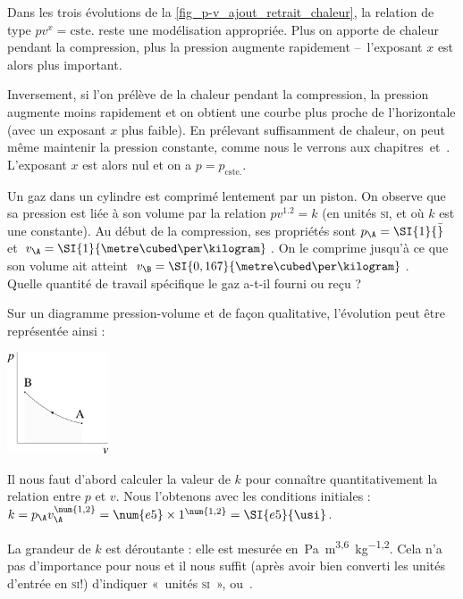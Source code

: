 		Dans les trois évolutions de la \cref{fig_p-v_ajout_retrait_chaleur}, la relation de type $p v^{x} = \text{cste.}$ reste une modélisation appropriée. Plus on apporte de chaleur pendant la compression, plus la pression augmente rapidement --\ l’exposant $x$ est alors plus important.

		Inversement, si l’on prélève de la chaleur pendant la compression, la pression augmente moins rapidement et on obtient une courbe plus proche de l’horizontale (avec un exposant $x$ plus faible). En prélevant suffisamment de chaleur, on peut même maintenir la pression constante, comme nous le verrons aux chapitres~\quatre et~\cinq. L’exposant $x$ est alors nul et on a $p = p_\text{cste.}$.
		
			\begin{anexample}
				Un gaz dans un cylindre est comprimé lentement par un piston. On observe que sa pression est liée à son volume par la relation $p v^{\num{1,2}} = k$ (en unités \textsc{si}, et où $k$ est une constante). Au début de la compression, ses propriétés sont $p_\A = \SI{1}{\bar}$ et $v_\A = \SI{1}{\metre\cubed\per\kilogram}$. On le comprime jusqu’à ce que son volume ait atteint $v_\B = \SI{0,167}{\metre\cubed\per\kilogram}$. \\
				Quelle quantité de travail spécifique le gaz a-t-il fourni ou reçu ?				
					\begin{answer}
						Sur un diagramme pression-volume et de façon qualitative, l’évolution peut être représentée ainsi :
							\begin{center}
								\includegraphics[width=3cm]{images/exe_pv_exp1.png}
							\end{center}
						Il nous faut d’abord calculer la valeur de $k$ pour connaître quantitativement la relation entre $p$ et $v$. Nous l’obtenons avec les conditions initiales : $k = p_\A v_\A^{\num{1,2}} = \num{e5} \times 1^{\num{1,2}} = \SI{e5}{\usi}$.
							\begin{remark} La grandeur de $k$ est déroutante : elle est mesurée en~\si{\pascal\metre\tothe{3,6}\per\kilogram\tothe{1,2}}. Cela n’a pas d’importance pour nous et il nous suffit (après avoir bien converti les unités d’entrée en \textsc{si}!) d’indiquer «~unités \textsc{si}~», ou~\si{\usi}.\end{remark}

\end{answer}
\end{anexample}
